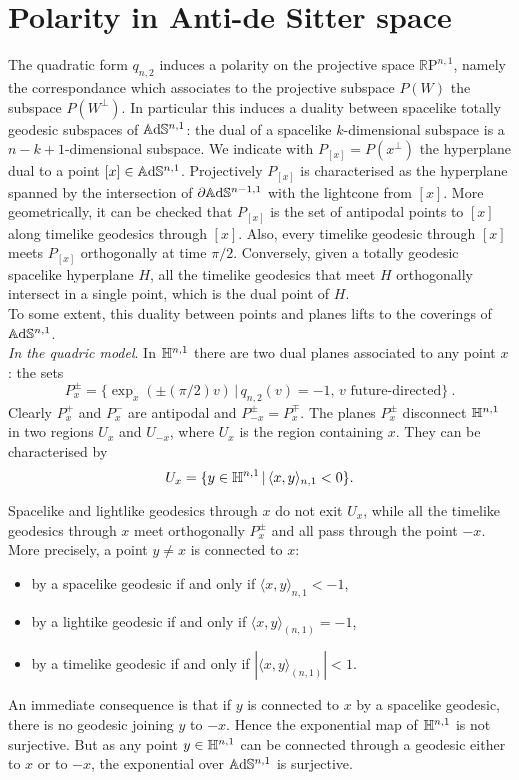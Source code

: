\section{Polarity in Anti-de Sitter space}
The quadratic form $q_{n,2}$ induces a polarity on the projective space $\mathbb{R} \text{P}^{n,1}$, namely the correspondance which associates to the projective subspace $P(W)$ the subspace $P(W^ \perp)$. In particular this induces a duality between spacelike totally geodesic subspaces of $\mathbb{A}\mathrm{d}\mathbb{S}^{n,1}$: the dual of a spacelike $k$-dimensional subspace is a $n-k+1$-dimensional subspace.
We indicate with $P_{[x]}=P(x^\perp)$ the hyperplane dual to a point $[x]\in \mathbb{A}\mathrm{d}\mathbb{S}^{n,1}$.
Projectively $P_{[x]}$ is characterised as the hyperplane spanned by the intersection of $\partial\mathbb{A}\mathrm{d}\mathbb{S}^{n-1,1}$ with the lightcone from $[x]$.
More geometrically, it can be checked that $P_{[x]}$ is the set of antipodal points to $[x]$ along timelike geodesics through $[x]$. Also, every timelike geodesic
through $[x]$ meets $P_{[x]}$ orthogonally at time $\pi/2$. Conversely, given a totally geodesic spacelike hyperplane $H$, all the timelike geodesics that meet $H$ orthogonally  intersect in a single point, which is the dual point of $H$.\\
To some extent, this duality between points and planes lifts to the coverings of $\mathbb{A}\mathrm{d}\mathbb{S}^{n,1}$.\\

\noindent\textit{In the quadric model}. In $\mathbb{H}^{n,1}$ there are two dual planes associated to any point $x$: the sets 
\[
P_{x}^\pm=\{\exp_{x}(\pm(\pi/2)v)\,|\,q_{n,2}(v)=-1,\,v\text{ future-directed}\}~.
\]
Clearly $P_{x}^+$ and $P_{x}^{-} $ are antipodal and  $P_{-x}^\pm=P_{x}^\mp$. The planes $P_x^{\pm}$ disconnect $\mathbb{H}^{n,1}$ in two regions $U_x$ and
$U_{-x}$, where $U_{x}$ is the region containing $x$. They can be characterised by 
\[
U_{x}=\{y\in\mathbb{H}^{n,1}\,|\,\langle x, y\rangle_{n,1}<0\}.
\]

Spacelike and lightlike geodesics through $x$ do not exit $U_{x}$, 
while all the timelike geodesics through $x$ meet orthogonally $P^{\pm}_x$ and all pass through the point $-x$.
More precisely, a point $y\neq x$ is connected to $x$:
\begin{itemize}
\item by a spacelike geodesic if and only if $\langle x,y\rangle_{n,1}<-1$,
\item by a lightike geodesic if and only if $\langle x,y\rangle_{(n,1)}=-1$,
\item by a timelike geodesic if and only if 
$|\langle x,y\rangle_{(n,1)}|<1$.
\end{itemize}
An immediate consequence is that if $y$ is connected to $x$ by a spacelike geodesic, there is no geodesic joining $y$ to $-x$.
Hence the exponential map of $\mathbb{H}^{n,1}$ is not surjective. But as any point $y\in\mathbb{H}^{n,1}$ can be connected through a geodesic either to $x$ or to $-x$,
the exponential over $\mathbb{A}\mathrm{d}\mathbb{S}^{n,1}$ is surjective.\\

